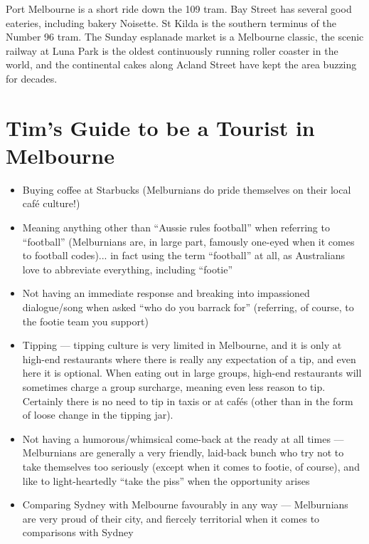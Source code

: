 Port Melbourne is a short ride down the 109 tram. Bay Street has several good
eateries, including bakery Noisette.
St Kilda is the southern terminus of the Number 96 tram. The Sunday 
esplanade
market is a Melbourne classic, the scenic railway at Luna Park is the 
oldest
continuously running roller coaster in the world, and the continental 
cakes
along Acland Street have kept the area buzzing for decades.






\section*{Tim's Guide to be a Tourist in Melbourne}
\vspace*{-1em}

\begin{itemize}
\item Buying coffee at Starbucks (Melburnians do pride themselves on
  their local caf\'e culture!)
\item Meaning anything other than ``Aussie rules football'' when
  referring to ``football'' (Melburnians are, in large part, famously
  one-eyed when it comes to football codes)... in fact using the term
  ``football'' at all, as Australians love to abbreviate everything,
  including ``footie''
\item Not having an immediate response and breaking into impassioned
  dialogue/song when asked ``who do you barrack for'' (referring, of
  course, to the footie team you support)
\item Tipping --- tipping culture is very limited in Melbourne, and it
  is only at high-end restaurants where there is really any expectation
  of a tip, and even here it is optional. When eating out in large
  groups, high-end restaurants will sometimes charge a group surcharge,
  meaning even less reason to tip. Certainly there is no need to tip in
  taxis or at caf\'es (other than in the form of loose change in the
  tipping jar).
\item Not having a humorous/whimsical come-back at the ready at all
  times --- Melburnians are generally a very friendly, laid-back bunch
  who try not to take themselves too seriously (except when it comes to
  footie, of course), and like to light-heartedly ``take the piss'' when
  the opportunity arises
\item Comparing Sydney with Melbourne favourably in any way ---
  Melburnians are very proud of their city, and fiercely territorial
  when it comes to comparisons with Sydney

\end{itemize}
